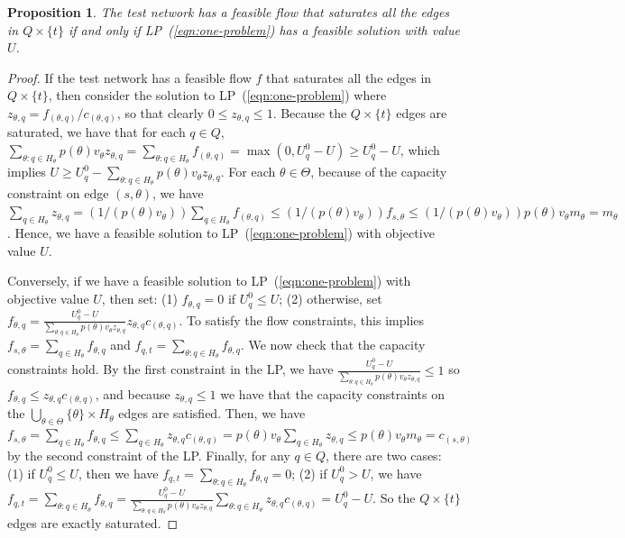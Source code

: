 \documentclass{article}
\newtheorem{proposition}{Proposition}
\begin{document}
\begin{proposition}
The test network has a feasible flow that  saturates all the edges in $Q
\times \{t\}$ if and only if LP~(\ref{eqn:one-problem}) has a feasible
solution with value $U$.
\label{prop:network}
\end{proposition}
\begin{proof}
  If the test network has a feasible flow $f$ that saturates all the edges
  in $Q \times \{t\}$, then consider the solution to
  LP~(\ref{eqn:one-problem}) where $z_{\theta, q} = f_{(\theta, q)} /
  c_{(\theta, q)}$, so that clearly $0 \leq z_{\theta, q} \leq 1$.
 Because the $Q \times \{t\}$ edges are saturated, we
  have that for each $q \in Q$, $\sum_{\theta:q \in H_\theta}
  p(\theta)v_\theta z_{\theta,q} = \sum_{\theta:q \in H_\theta} f_{(\theta,
    q)} = \max(0, U_q^0-U) \geq U_q^0-U$, which implies $U \geq U_q^0 -
  \sum_{\theta:q \in H_\theta} p(\theta)v_\theta z_{\theta,q}$.  For each
  $\theta \in \Theta$, because of the capacity constraint on edge $(s,
  \theta)$, we have $\sum_{q \in H_\theta} z_{\theta,q} = (1/(p(\theta)
  v_\theta)) \sum_{q \in H_\theta} f_{(\theta, q)} \leq (1/(p(\theta)
  v_\theta)) f_{s,\theta} \leq (1/(p(\theta) v_\theta)) p(\theta) v_\theta
  m_\theta = m_\theta$.  Hence, we have a feasible solution to
  LP~(\ref{eqn:one-problem}) with objective value $U$.

  Conversely, if we have a feasible solution to LP~(\ref{eqn:one-problem})
  with objective value $U$, then set: (1) $f_{\theta,q} = 0$ if $U_q^0 \leq
  U$; (2) otherwise, set $f_{\theta,q} = \frac{U_q^0-U}{\sum_{\theta:q \in
      H_\theta} p(\theta)v_\theta z_{\theta,q}} z_{\theta,q} c_{(\theta,
    q)}$.  To satisfy the flow constraints, this implies $f_{s,\theta} =
  \sum_{q \in H_\theta} f_{\theta,q}$ and $f_{q,t} = \sum_{\theta: q \in
    H_\theta} f_{\theta,q}$.  We now check that the capacity constraints
  hold. By the first constraint in the LP, we have
  $\frac{U_q^0-U}{\sum_{\theta:q \in H_\theta} p(\theta)v_\theta z_{\theta,q}}
\leq 1$ so $f_{\theta,q}
    \leq z_{\theta,q} c_{(\theta, q)}$, and because $z_{\theta,q} \leq 1$
    we have that the capacity constraints on the  $\bigcup_{\theta \in \Theta} \{\theta\} \times
H_\theta$ edges
 are satisfied.  Then, we have $f_{s,\theta} = \sum_{q \in
      H_\theta} f_{\theta,q} \leq \sum_{q \in
      H_\theta} z_{\theta,q} c_{(\theta, q)} = 
p(\theta) v_\theta \sum_{q \in
      H_\theta} z_{\theta,q}  \leq p(\theta) v_\theta m_\theta =
    c_{(s,\theta)}$ by the second constraint of the LP. 
  Finally, for any $q \in Q$, there are two cases: (1) if $U_q^0 \leq U$,
  then we have $f_{q,t} = \sum_{\theta: q \in H_\theta} f_{\theta,q} = 0$;
  (2) if $U_q^0 > U$, we have $f_{q,t} = \sum_{\theta: q \in H_\theta}
  f_{\theta,q} = \frac{U_q^0-U}{\sum_{\theta:q \in H_\theta}
    p(\theta)v_\theta z_{\theta,q}} \sum_{\theta: q \in H_\theta}
  z_{\theta,q} c_{(\theta, q)} = U_q^0-U$.  So the $Q \times \{t\}$ edges
  are exactly saturated.
\end{proof}
\end{document}
